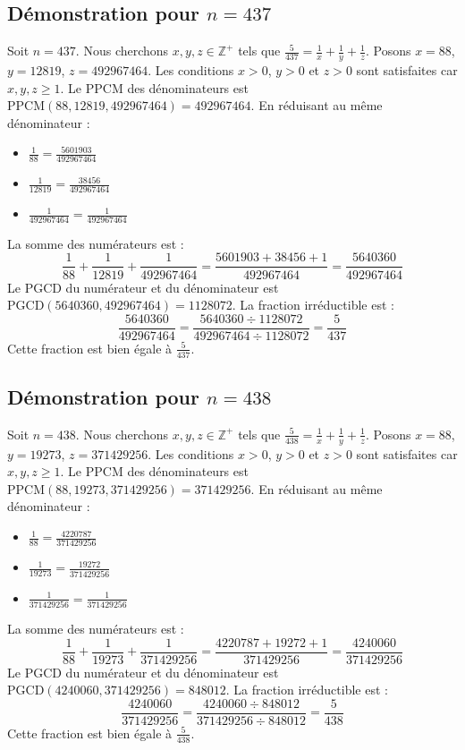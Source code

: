 \documentclass[11pt,a4paper]{article}
\begin{document}
\subsection{Démonstration pour $n = 437$}
Soit $n = 437$. Nous cherchons $x, y, z \in \mathbb{Z}^{+}$ tels que $\frac{5}{437} = \frac{1}{x} + \frac{1}{y} + \frac{1}{z}$.
Posons $x = 88$, $y = 12819$, $z = 492967464$.
Les conditions $x > 0$, $y > 0$ et $z > 0$ sont satisfaites car $x, y, z \geq 1$.
Le PPCM des dénominateurs est $\text{PPCM}(88, 12819, 492967464) = 492967464$.
En réduisant au même dénominateur :
\begin{itemize}
    \item $\frac{1}{88} = \frac{5601903}{492967464}$
    \item $\frac{1}{12819} = \frac{38456}{492967464}$
    \item $\frac{1}{492967464} = \frac{1}{492967464}$
\end{itemize}
La somme des numérateurs est :
$$ \frac{1}{88} + \frac{1}{12819} + \frac{1}{492967464} = \frac{5601903 + 38456 + 1}{492967464} = \frac{5640360}{492967464} $$
Le PGCD du numérateur et du dénominateur est $\text{PGCD}(5640360, 492967464) = 1128072$.
La fraction irréductible est :
$$ \frac{5640360}{492967464} = \frac{5640360 \div 1128072}{492967464 \div 1128072} = \frac{5}{437} $$
Cette fraction est bien égale à $\frac{5}{437}$.

\subsection{Démonstration pour $n = 438$}
Soit $n = 438$. Nous cherchons $x, y, z \in \mathbb{Z}^{+}$ tels que $\frac{5}{438} = \frac{1}{x} + \frac{1}{y} + \frac{1}{z}$.
Posons $x = 88$, $y = 19273$, $z = 371429256$.
Les conditions $x > 0$, $y > 0$ et $z > 0$ sont satisfaites car $x, y, z \geq 1$.
Le PPCM des dénominateurs est $\text{PPCM}(88, 19273, 371429256) = 371429256$.
En réduisant au même dénominateur :
\begin{itemize}
    \item $\frac{1}{88} = \frac{4220787}{371429256}$
    \item $\frac{1}{19273} = \frac{19272}{371429256}$
    \item $\frac{1}{371429256} = \frac{1}{371429256}$
\end{itemize}
La somme des numérateurs est :
$$ \frac{1}{88} + \frac{1}{19273} + \frac{1}{371429256} = \frac{4220787 + 19272 + 1}{371429256} = \frac{4240060}{371429256} $$
Le PGCD du numérateur et du dénominateur est $\text{PGCD}(4240060, 371429256) = 848012$.
La fraction irréductible est :
$$ \frac{4240060}{371429256} = \frac{4240060 \div 848012}{371429256 \div 848012} = \frac{5}{438} $$
Cette fraction est bien égale à $\frac{5}{438}$.
\end{document}
